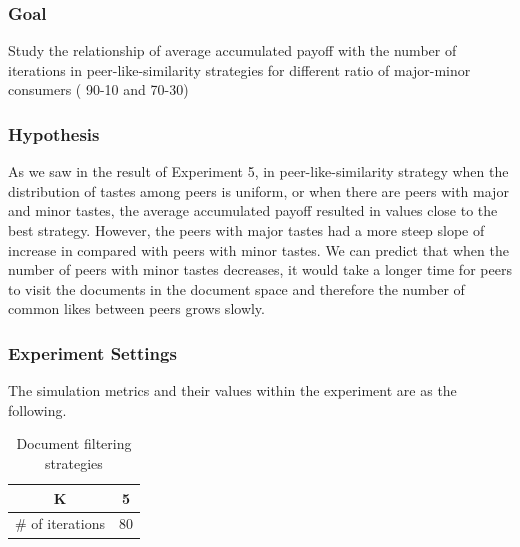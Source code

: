 \documentclass [12pt]{article} \usepackage{multicol}
\begin{document}
\subsubsection{Goal}

 Study the relationship of average accumulated payoff with the number of iterations  
in peer-like-similarity strategies for different ratio of major-minor consumers ( 90-10 and 70-30)

\subsubsection{Hypothesis}

As we saw in the result of Experiment 5, in peer-like-similarity strategy when the distribution of tastes among peers is uniform, 
or when there are peers with major and minor tastes, the  average accumulated payoff resulted in values close to the best strategy.
However, the peers with major tastes had a more steep slope of increase in compared with peers with minor tastes. 
We can predict that when the number of peers with minor tastes decreases, it would take a longer time for peers to visit the documents in the 
document space and therefore the number of common likes between peers grows slowly.  

\subsubsection{Experiment Settings}

The simulation metrics and their values within the experiment are as the following.

\begin{table}[h!]
\caption{Document filtering strategies}
\begin{center}


\begin{tabular}{|c|c|}
\hline
K   & 5 \\ \hline
\# of iterations & 80 \\ \hline
\end{tabular}


\end{center}
\label{default}
\end{table}
\end{document}

